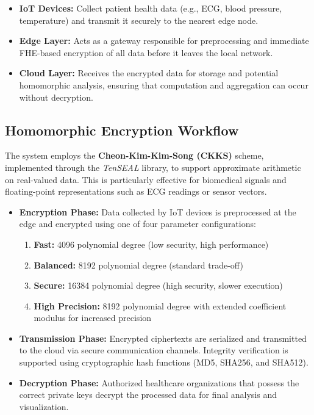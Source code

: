 \documentclass[review]{elsarticle}
\begin{document}
\begin{itemize}
    \item \textbf{IoT Devices:} Collect patient health data (e.g., ECG, blood pressure, temperature) and transmit it securely to the nearest edge node.
    \item \textbf{Edge Layer:} Acts as a gateway responsible for preprocessing and immediate FHE-based encryption of all data before it leaves the local network.
    \item \textbf{Cloud Layer:} Receives the encrypted data for storage and potential homomorphic analysis, ensuring that computation and aggregation can occur without decryption.
\end{itemize}

\subsection{Homomorphic Encryption Workflow}
The system employs the \textbf{Cheon-Kim-Kim-Song (CKKS)} scheme, implemented through the \textit{TenSEAL} library, to support approximate arithmetic on real-valued data. This is particularly effective for biomedical signals and floating-point representations such as ECG readings or sensor vectors.

\begin{itemize}
    \item \textbf{Encryption Phase:} Data collected by IoT devices is preprocessed at the edge and encrypted using one of four parameter configurations: 
    \begin{enumerate}
        \item \textbf{Fast:} 4096 polynomial degree (low security, high performance)
        \item \textbf{Balanced:} 8192 polynomial degree (standard trade-off)
        \item \textbf{Secure:} 16384 polynomial degree (high security, slower execution)
        \item \textbf{High Precision:} 8192 polynomial degree with extended coefficient modulus for increased precision
    \end{enumerate}
    \item \textbf{Transmission Phase:} Encrypted ciphertexts are serialized and transmitted to the cloud via secure communication channels. Integrity verification is supported using cryptographic hash functions (MD5, SHA256, and SHA512).
    \item \textbf{Decryption Phase:} Authorized healthcare organizations that possess the correct private keys decrypt the processed data for final analysis and visualization.
\end{itemize}
\end{document}
